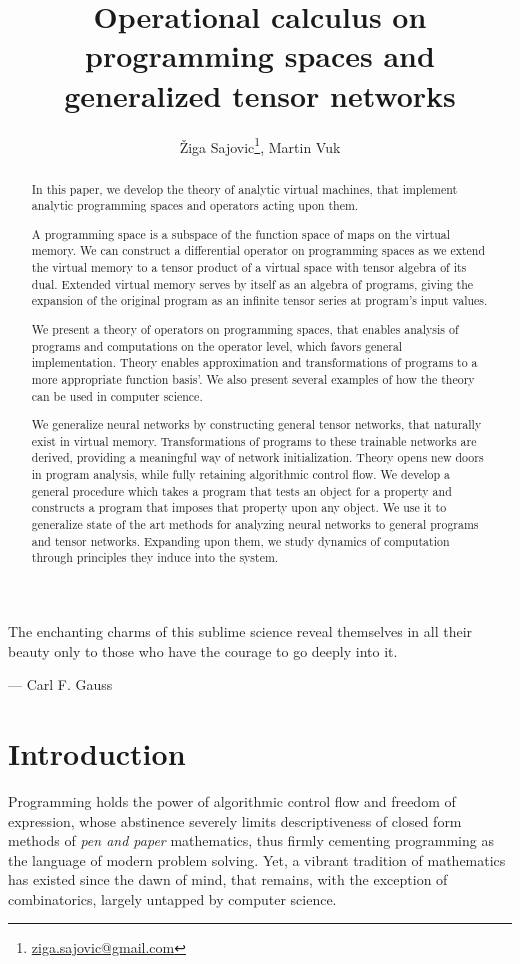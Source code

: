 \documentclass[preprint,12pt]{elsarticle}
\title{Operational calculus on programming spaces and generalized tensor networks}
\author{Žiga Sajovic\footnote{\href{mail.to:ziga.sajovic@gmail.com}{ziga.sajovic@gmail.com}}, Martin Vuk}
\begin{document}
\maketitle
\begin{abstract}
In this paper, we develop the theory of analytic virtual machines, that
implement analytic programming spaces and operators acting upon them.

A programming space is a subspace of the function space of maps on the virtual
memory. We can construct a differential operator on programming spaces as we 
extend the virtual memory to a tensor product of a virtual space with tensor algebra
of its dual. Extended virtual memory serves by itself as an algebra of programs, giving the expansion of the original program as an infinite tensor series at
program's input values. 

We present a theory of operators on programming spaces, that enables analysis of programs
and computations on the operator level, which favors general implementation. Theory enables
approximation and transformations of programs to a more appropriate function basis'. We
also present several examples of how the theory can be used in computer science.

We generalize neural networks by constructing general tensor networks, that naturally exist in virtual memory. Transformations of programs to these trainable networks are derived, providing a meaningful way of network initialization.
Theory opens new doors in program analysis, while fully retaining algorithmic control flow. We develop a general
procedure which takes a program that tests an object for a property and
constructs a program that imposes that property upon any object. 
We use it to generalize state of the art methods for analyzing neural networks to general programs and tensor networks. Expanding upon them, we study dynamics of computation through principles they induce into the system.

\end{abstract}

\epigraph{The enchanting charms of this sublime science reveal themselves in all their beauty only to those who have the courage to go deeply into it.}{--- \textup{Carl F. Gauss}}


\clearpage
\tableofcontents
\clearpage

\section{Introduction}
Programming holds the power of algorithmic control flow and freedom of expression, whose abstinence severely limits descriptiveness of closed form methods of \textit{pen and paper} mathematics, thus firmly cementing programming as the language of modern problem solving. Yet, a vibrant tradition of mathematics has existed since the dawn of mind, that remains, with the exception of combinatorics, largely untapped by computer science. 
\end{document}
